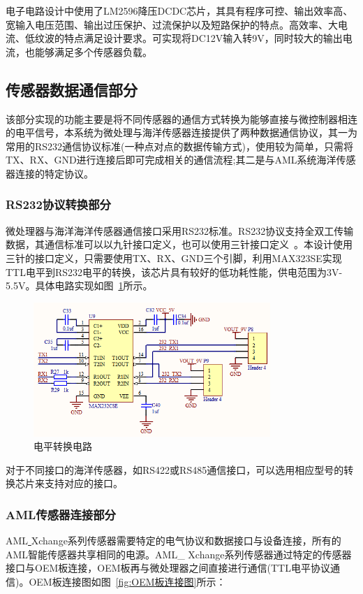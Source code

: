 电子电路设计中使用了LM2596降压DCDC芯片，其具有程序可控、输出效率高、宽输入电压范围、输出过压保护、过流保护以及短路保护的特点。高效率、大电流、低纹波的特点满足设计要求。可实现将DC12V输入转9V，同时较大的输出电流，也能够满足多个传感器负载。

\subsection{传感器数据通信部分}
该部分实现的功能主要是将不同传感器的通信方式转换为能够直接与微控制器相连的电平信号，本系统为微处理与海洋传感器连接提供了两种数据通信协议，其一为常用的RS232通信协议标准(一种点对点的数据传输方式)，使用较为简单，只需将TX、RX、GND进行连接后即可完成相关的通信流程;其二是与AML系统海洋传感器连接的特定协议。

\subsubsection{RS232协议转换部分}
微处理器与海洋海洋传感器通信接口采用RS232标准。RS232协议支持全双工传输数据，其通信标准可以以九针接口定义，也可以使用三针接口定义~\cite{2020xxw}。本设计使用三针的接口定义，只需要使用TX、RX、GND三个引脚，利用MAX323SE实现TTL电平到RS232电平的转换，该芯片具有较好的低功耗性能，供电范围为3V-5.5V。具体电路实现如图~\ref{fig:RS232}所示。

\begin{figure}[ht]
    \centering
	\includegraphics[width=0.8\textwidth]{fig/RS232.png}
	\caption{电平转换电路}
	\label{fig:RS232}
\end{figure}

对于不同接口的海洋传感器，如RS422或RS485通信接口，可以选用相应型号的转换芯片来支持对应的接口。

\subsubsection{AML传感器连接部分}
AML\uline{ }Xchange系列传感器需要特定的电气协议和数据接口与设备连接，所有的AML智能传感器共享相同的电源。AML\_ Xchange系列传感器通过特定的传感器接口与OEM板连接，OEM板再与微处理器之间直接进行通信(TTL电平协议通信)。OEM板连接图如图~\ref{fig:OEM板连接图}所示：

